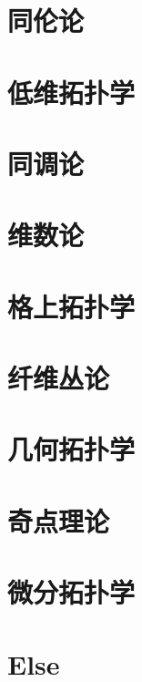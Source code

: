 \documentclass[UTF8]{../09-Mathematics}
\begin{document}
 
\begin{comment}
    dsa 
    X \autorightleftharpoons{d969696}{3}Y
    \overset{f}{ \underset{g}{\rightleftharpoons} } 
    \xlongequal[d]{dfafdsf}
    \autorightleftharpoons{f}{g} Z

    \begin{equation}
    \label{homeomorphism}
    \begin{split}
        &\text{if: }X \autorightleftharpoons{f}{g}Y\\
        &\text{where: }g\circ f =1_X,f\circ g=1_Y\\
        &\text{then: }X\cong Y\\
    \end{split}
    \end{equation}

\end{comment}


\chapter{同伦论}
\chapter{低维拓扑学}
\chapter{同调论}
\chapter{维数论}
\chapter{格上拓扑学}
\chapter{纤维丛论}
\chapter{几何拓扑学}
\chapter{奇点理论}
\chapter{微分拓扑学}
\chapter{Else}
\end{document}
